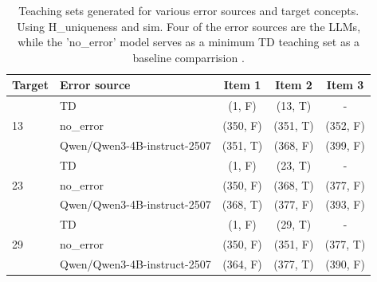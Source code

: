 \begin{table}[h]
\centering
\begin{tabular}{llccc}
\toprule
Target & Error source & Item 1 & Item 2 & Item 3 \\
\midrule
\multirow{3}{*}{13} & TD & (1, F) & (13, T) & - \\
 & no\_error & (350, F) & (351, T) & (352, F) \\
 & Qwen/\allowbreak Qwen3-4B-instruct-2507 & (351, T) & (368, F) & (399, F) \\
\midrule
\multirow{3}{*}{23} & TD & (1, F) & (23, T) & - \\
 & no\_error & (350, F) & (368, T) & (377, F) \\
 & Qwen/\allowbreak Qwen3-4B-instruct-2507 & (368, T) & (377, F) & (393, F) \\
\midrule
\multirow{3}{*}{29} & TD & (1, F) & (29, T) & - \\
 & no\_error & (350, F) & (351, F) & (377, T) \\
 & Qwen/\allowbreak Qwen3-4B-instruct-2507 & (364, F) & (377, T) & (390, F) \\
\midrule
\bottomrule
\end{tabular}
\caption{Teaching sets generated for various error sources and target concepts. Using H\_uniqueness and sim. Four of the error sources are the LLMs, while the 'no\_error' model serves as a minimum TD teaching set as a baseline comparrision .}
\end{table}